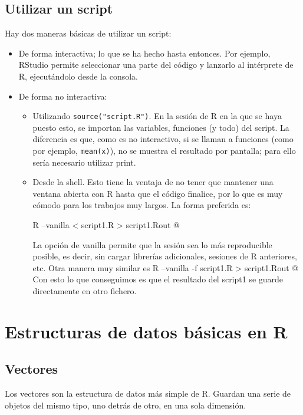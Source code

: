 \documentclass{config/apuntes}\usepackage[]{graphicx}\usepackage[]{xcolor}
\newcommand{\code}[1]{\texttt{#1}}
\begin{document}
\subsection{Utilizar un script}
Hay dos maneras básicas de utilizar un script:
\begin{itemize}
\item De forma interactiva; lo que se ha hecho hasta entonces. Por ejemplo, RStudio permite seleccionar una parte del código y lanzarlo al intérprete de R, ejecutándolo desde la consola.
\item De forma no interactiva:
\begin{itemize}
\item Utilizando \code{source("script.R")}. En la sesión de R en la que se haya puesto esto, se importan las variables, funciones (y todo) del script. La diferencia es que, como es no interactivo, si se llaman a funciones (como por ejemplo, \code{mean(x)}), no se muestra el resultado por pantalla; para ello sería necesario utilizar print. 
\item Desde la shell. Esto tiene la ventaja de no tener que mantener una ventana abierta con R hasta que el código finalice, por lo que es muy cómodo para los trabajos muy largos. La forma preferida es:

\verb@ R --vanilla < script1.R > script1.Rout @

La opción de vanilla permite que la sesión sea lo más reproducible posible, es decir, sin cargar librerías adicionales, sesiones de R anteriores, etc. Otra manera muy similar es \verb@ R --vanilla -f script1.R > script1.Rout @ Con esto lo que conseguimos es que el resultado del script1 se guarde directamente en otro fichero. 
\end{itemize}
\end{itemize}

\section{Estructuras de datos básicas en R}
\subsection{Vectores}
Los vectores son la estructura de datos más simple de R. Guardan una serie de objetos del mismo tipo, uno detrás de otro, en una sola dimensión.
\end{document}
